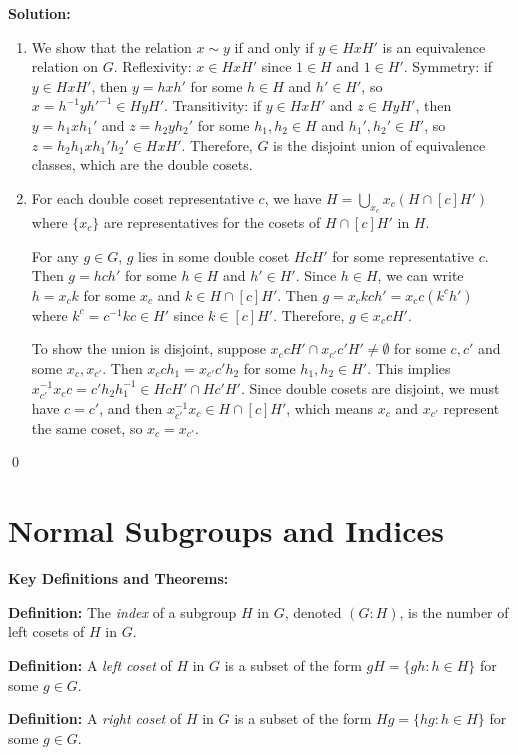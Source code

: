 \noindent\textbf{Solution:}
\begin{enumerate}[label=(\alph*)]
\item We show that the relation $x \sim y$ if and only if $y \in HxH'$ is an equivalence relation on $G$. Reflexivity: $x \in HxH'$ since $1 \in H$ and $1 \in H'$. Symmetry: if $y \in HxH'$, then $y = hxh'$ for some $h \in H$ and $h' \in H'$, so $x = h^{-1}yh'^{-1} \in HyH'$. Transitivity: if $y \in HxH'$ and $z \in HyH'$, then $y = h_1xh_1'$ and $z = h_2yh_2'$ for some $h_1, h_2 \in H$ and $h_1', h_2' \in H'$, so $z = h_2h_1xh_1'h_2' \in HxH'$. Therefore, $G$ is the disjoint union of equivalence classes, which are the double cosets.

\item For each double coset representative $c$, we have $H = \bigcup_{x_c} x_c(H \cap [c]H')$ where $\{x_c\}$ are representatives for the cosets of $H \cap [c]H'$ in $H$. 

For any $g \in G$, $g$ lies in some double coset $HcH'$ for some representative $c$. Then $g = hch'$ for some $h \in H$ and $h' \in H'$. Since $h \in H$, we can write $h = x_c k$ for some $x_c$ and $k \in H \cap [c]H'$. Then $g = x_c kch' = x_c c(k^c h')$ where $k^c = c^{-1}kc \in H'$ since $k \in [c]H'$. Therefore, $g \in x_c cH'$.

To show the union is disjoint, suppose $x_c cH' \cap x_{c'} c'H' \neq \emptyset$ for some $c, c'$ and some $x_c, x_{c'}$. Then $x_c ch_1 = x_{c'} c'h_2$ for some $h_1, h_2 \in H'$. This implies $x_{c'}^{-1}x_c c = c'h_2h_1^{-1} \in HcH' \cap Hc'H'$. Since double cosets are disjoint, we must have $c = c'$, and then $x_{c'}^{-1}x_c \in H \cap [c]H'$, which means $x_c$ and $x_{c'}$ represent the same coset, so $x_c = x_{c'}$.
\end{enumerate}


\qed
\section{Normal Subgroups and Indices}

\textbf{Key Definitions and Theorems:}

\textbf{Definition:} The \textit{index} of a subgroup $H$ in $G$, denoted $(G : H)$, is the number of left cosets of $H$ in $G$.

\textbf{Definition:} A \textit{left coset} of $H$ in $G$ is a subset of the form $gH = \{gh : h \in H\}$ for some $g \in G$.

\textbf{Definition:} A \textit{right coset} of $H$ in $G$ is a subset of the form $Hg = \{hg : h \in H\}$ for some $g \in G$.

